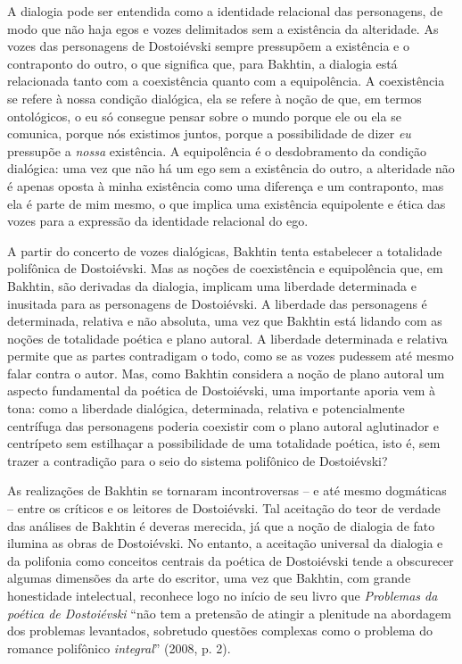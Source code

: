 A dialogia pode ser entendida como a identidade relacional das
personagens, de modo que não haja egos e vozes delimitados sem a
existência da alteridade. As vozes das personagens de Dostoiévski sempre
pressupõem a existência e o contraponto do outro, o que significa que,
para Bakhtin, a dialogia está relacionada tanto com a coexistência
quanto com a equipolência. A coexistência se refere à nossa condição
dialógica, ela se refere à noção de que, em termos ontológicos, o eu só
consegue pensar sobre o mundo porque ele ou ela se comunica, porque nós
existimos juntos, porque a possibilidade de dizer \emph{eu} pressupõe a
\emph{nossa} existência. A equipolência é o desdobramento da condição
dialógica: uma vez que não há um ego sem a existência do outro, a
alteridade não é apenas oposta à minha existência como uma diferença e
um contraponto, mas ela é parte de mim mesmo, o que implica uma
existência equipolente e ética das vozes para a expressão da identidade
relacional do ego.

A partir do concerto de vozes dialógicas, Bakhtin tenta estabelecer a
totalidade polifônica de Dostoiévski. Mas as noções de coexistência e
equipolência que, em Bakhtin, são derivadas da dialogia, implicam uma
liberdade determinada e inusitada para as personagens de Dostoiévski. A
liberdade das personagens é determinada, relativa e não absoluta, uma
vez que Bakhtin está lidando com as noções de totalidade poética e plano
autoral. A liberdade determinada e relativa permite que as partes
contradigam o todo, como se as vozes pudessem até mesmo falar contra o
autor. Mas, como Bakhtin considera a noção de plano autoral um aspecto
fundamental da poética de Dostoiévski, uma importante aporia vem à tona:
como a liberdade dialógica, determinada, relativa e potencialmente
centrífuga das personagens poderia coexistir com o plano autoral
aglutinador e centrípeto sem estilhaçar a possibilidade de uma
totalidade poética, isto é, sem trazer a contradição para o seio do
sistema polifônico de Dostoiévski?

As realizações de Bakhtin se tornaram incontroversas -- e até mesmo
dogmáticas -- entre os críticos e os leitores de Dostoiévski. Tal
aceitação do teor de verdade das análises de Bakhtin é deveras merecida,
já que a noção de dialogia de fato ilumina as obras de Dostoiévski. No
entanto, a aceitação universal da dialogia e da polifonia como conceitos
centrais da poética de Dostoiévski tende a obscurecer algumas dimensões
da arte do escritor, uma vez que Bakhtin, com grande honestidade
intelectual, reconhece logo no início de seu livro que \emph{Problemas
da poética de Dostoiévski} ``não tem a pretensão de atingir a plenitude
na abordagem dos problemas levantados, sobretudo questões complexas como
o problema do romance polifônico \emph{integral}'' (2008, p. 2).

